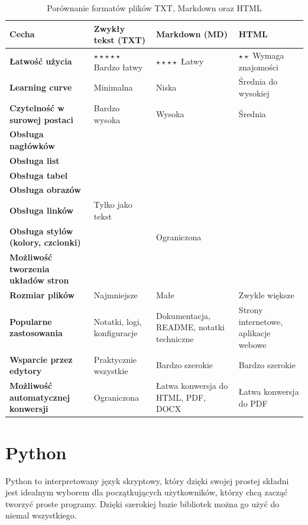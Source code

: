 \documentclass[12pt, a4paper]{article}
\newcommand{\cmark}{\textcolor{green!60!black}{\ding{51}}}
\newcommand{\xmark}{\textcolor{red}{\ding{55}}}
\begin{document}
\begin{table}[H]
\centering
\renewcommand{\arraystretch}{1.25}
\small
\begin{tabularx}{\textwidth}{|>{\raggedright\arraybackslash}p{4cm}|>{\centering\arraybackslash}X|>{\centering\arraybackslash}X|>{\centering\arraybackslash}X|}
\hline
\textbf{Cecha} & \textbf{Zwykły tekst (TXT)} & \textbf{Markdown (MD)} & \textbf{HTML} \\
\hline
\textbf{Łatwość użycia} & $\star\star\star\star\star$ Bardzo łatwy & $\star\star\star\star$ Łatwy & $\star\star$ Wymaga znajomości \\
\hline
\textbf{Learning curve} & Minimalna & Niska & Średnia do wysokiej \\
\hline
\textbf{Czytelność w surowej postaci} & Bardzo wysoka & Wysoka & Średnia \\
\hline
\textbf{Obsługa nagłówków} & \xmark & \cmark & \cmark \\
\hline
\textbf{Obsługa list} & \xmark & \cmark & \cmark \\
\hline
\textbf{Obsługa tabel} & \xmark & \cmark & \cmark \\
\hline
\textbf{Obsługa obrazów} & \xmark & \cmark & \cmark \\
\hline
\textbf{Obsługa linków} & Tylko jako tekst & \cmark & \cmark \\
\hline
\textbf{Obsługa stylów (kolory, czcionki)} & \xmark & Ograniczona & \cmark \\
\hline
\textbf{Możliwość tworzenia układów stron} & \xmark & \xmark & \cmark \\
\hline
\textbf{Rozmiar plików} & Najmniejsze & Małe & Zwykle większe \\
\hline
\textbf{Popularne zastosowania} & Notatki, logi, konfiguracje & Dokumentacja, README, notatki techniczne & Strony internetowe, aplikacje webowe \\
\hline
\textbf{Wsparcie przez edytory} & Praktycznie wszystkie & Bardzo szerokie & Bardzo szerokie \\
\hline
\textbf{Możliwość automatycznej konwersji} & Ograniczona & Łatwa konwersja do HTML, PDF, DOCX & Łatwa konwersja do PDF \\
\hline
\end{tabularx}
\caption{Porównanie formatów plików TXT, Markdown oraz HTML}
\end{table}

\section{Python}
Python to interpretowany język skryptowy, który dzięki swojej prostej składni jest idealnym wyborem dla początkujących użytkowników, którzy chcą zacząć tworzyć proste programy. Dzięki szerokiej bazie bibliotek można go użyć do niemal wszystkiego.
\end{document}

